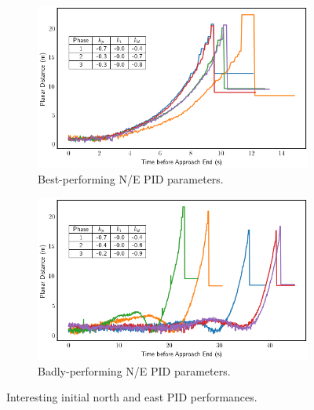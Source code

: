 \begin{figure}[ht]
    \centering
    \begin{subfigure}[b]{0.45\textwidth}
        \centering
        \includegraphics[width=\textwidth]{images/best_initial_ne_pid_gains.png}
        \caption{Best-performing N/E PID parameters.}
        \label{subfig:best_initial_pid_tuning}
    \end{subfigure}
    \begin{subfigure}[b]{0.45\textwidth}
        \centering
        \includegraphics[width=\textwidth]{images/bad_ne_pid_tuning.png}
        \caption{Badly-performing N/E PID parameters.}
        \label{subfig:bad_initial_pid_tuning}
    \end{subfigure}
    \caption{Interesting initial north and east PID performances.}
    \label{fig:initial_ne_pid_gains}
\end{figure}

